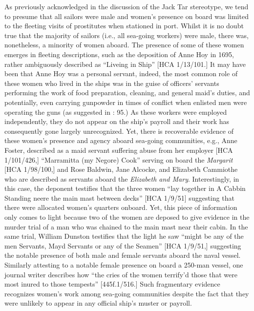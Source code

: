   As previously acknowledged in the discussion of the Jack Tar stereotype, we tend to presume that all sailors were male and women’s presence on board was limited to the fleeting visits of prostitutes when stationed in port. Whilst it is no doubt true that the majority of sailors (i.e., all sea-going workers) were male, there was, nonetheless, a minority of women aboard. The presence of some of these women emerges in fleeting descriptions, such as the deposition of Anne Hoy in 1695, rather ambiguously described as “Liveing in Ship” [HCA 1/13/101.]  It may have been that Anne Hoy was a personal servant, indeed, the most common role of these women who lived in the ships was in the guise of officers’ servants performing the work of food preparation, cleaning, and general maid’s duties, and potentially, even carrying gunpowder in times of conflict when enlisted men were operating the guns (as suggested in \citealt{Brown2011}: 95.) As these workers were employed independently, they do not appear on the ship’s payroll and their work has consequently gone largely unrecognized. Yet, there is recoverable evidence of these women’s presence and agency aboard sea-going communities, e.g., Anne Foster, described as a maid servant suffering abuse from her employer [HCA 1/101/426,] “Marramitta (my Negore) Cook” serving on board the \textit{Margarit} [HCA 1/98/100,] and Rose Baldwin, Jane Alcocke, and Elizabeth Cammiothe who are described as servants aboard the \textit{Elizabeth and Mary}. Interestingly, in this case, the deponent testifies that the three women “lay together in A Cabbin Standing neere the main mast between decks” [HCA 1/9/51] suggesting that there were allocated women’s quarters onboard. Yet, this piece of information only comes to light because two of the women are deposed to give evidence in the murder trial of a man who was chained to the main mast near their cabin. In the same trial, William Dunston testifies that the light he saw “might be any of the men Servants, Mayd Servants or any of the Seamen” [HCA 1/9/51,] suggesting the notable presence of both male and female servants aboard the naval vessel. Similarly attesting to a notable female presence on board a 250-man vessel, one journal writer describes how “the cries of the women terrify’d those that were most inured to those tempests” [445f.1/516.] Such fragmentary evidence recognizes women’s work among sea-going communities despite the fact that they were unlikely to appear in any official ship’s muster or payroll. 

